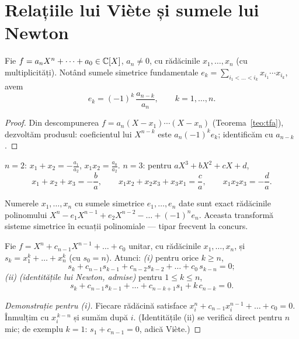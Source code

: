 \section{Relațiile lui Viète și sumele lui Newton}

\begin{teorema}[Viète]\label{teo:viete}
Fie $f=a_nX^n+\dots+a_0\in\mathbb{C}[X]$, $a_n\neq0$, cu rădăcinile $x_1,\dots,x_n$ (cu multiplicități). Notând sumele simetrice fundamentale $e_k=\sum_{i_1<\dots<i_k}x_{i_1}\cdots x_{i_k}$, avem
\[
e_k=(-1)^k\,\frac{a_{n-k}}{a_n},\qquad k=1,\dots,n.
\]
\end{teorema}

\begin{proof}
Din descompunerea $f=a_n(X-x_1)\cdots(X-x_n)$ (Teorema~\ref{teo:tfa}), dezvoltăm produsul: coeficientul lui $X^{n-k}$ este $a_n(-1)^ke_k$; identificăm cu $a_{n-k}$.
\end{proof}

\begin{exemplu}
$n=2$: $x_1+x_2=-\frac{a_1}{a_2}$, $x_1x_2=\frac{a_0}{a_2}$.\quad
$n=3$: pentru $aX^3+bX^2+cX+d$,
\[
x_1+x_2+x_3=-\frac ba,\qquad x_1x_2+x_2x_3+x_3x_1=\frac ca,\qquad x_1x_2x_3=-\frac da.
\]
\end{exemplu}

\begin{observatie}[reciproca]
Numerele $x_1,\dots,x_n$ cu sumele simetrice $e_1,\dots,e_n$ date sunt exact rădăcinile polinomului
$X^n-e_1X^{n-1}+e_2X^{n-2}-\dots+(-1)^ne_n$. Aceasta transformă sisteme simetrice în ecuații polinomiale --- tipar frecvent la concurs.
\end{observatie}

\begin{teorema}\label{teo:newton}
Fie $f=X^n+c_{n-1}X^{n-1}+\dots+c_0$ unitar, cu rădăcinile $x_1,\dots,x_n$, și $s_k=x_1^k+\dots+x_n^k$ (cu $s_0=n$). Atunci:
\emph{(i)} pentru orice $k\ge n$,
\[
s_k+c_{n-1}s_{k-1}+c_{n-2}s_{k-2}+\dots+c_0\,s_{k-n}=0;
\]
\emph{(ii)} \emph{(identitățile lui Newton, admise)} pentru $1\le k\le n$,
\[
s_k+c_{n-1}s_{k-1}+\dots+c_{n-k+1}s_1+k\,c_{n-k}=0.
\]
\end{teorema}

\begin{proof}[Demonstrație pentru (i)]
Fiecare rădăcină satisface $x_i^n+c_{n-1}x_i^{n-1}+\dots+c_0=0$. Înmulțim cu $x_i^{\,k-n}$ și sumăm după $i$. (Identitățile (ii) se verifică direct pentru $n$ mic; de exemplu $k=1$: $s_1+c_{n-1}=0$, adică Viète.)
\end{proof}

